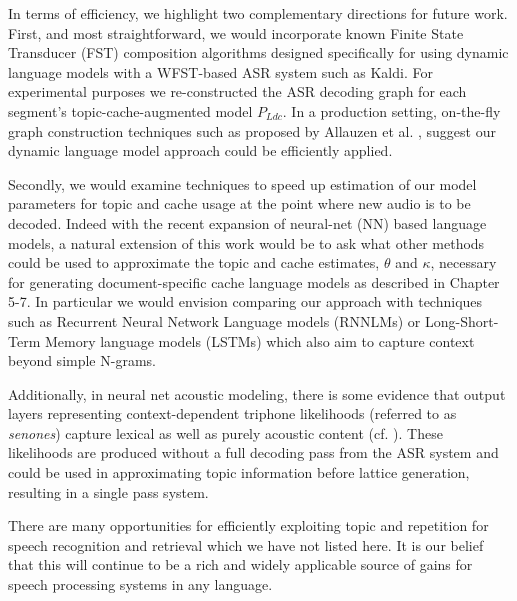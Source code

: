 In terms of efficiency, we highlight two complementary directions for future work.  First, and most straightforward, we would incorporate known Finite State Transducer (FST) composition algorithms designed specifically for using dynamic language models with a WFST-based ASR system such as Kaldi.  For experimental purposes we re-constructed the ASR decoding graph for each segment's topic-cache-augmented model $P_{Ldc}$.  In a production setting, on-the-fly graph construction techniques such as proposed by Allauzen et al. \cite{allauzen2009}, suggest our dynamic language model approach could be efficiently applied.

Secondly, we would examine techniques to speed up estimation of our model parameters for topic and cache usage at the point where new audio is to be decoded.  Indeed with the recent expansion of neural-net (NN) based language models, a natural extension of this work would be to ask what other methods could be used to approximate the topic and cache estimates, $\theta$ and $\kappa$, necessary for generating document-specific cache language models as described in Chapter 5-7.  In particular we would envision comparing our approach with techniques such as Recurrent Neural Network Language models (RNNLMs) or Long-Short-Term Memory language models (LSTMs) which also aim to capture context beyond simple N-grams.

Additionally, in neural net acoustic modeling, there is some evidence that output layers representing context-dependent triphone likelihoods (referred to as \textit{senones}) capture lexical as well as purely acoustic content (cf. \cite{wintrode2015recommender}).  These likelihoods are produced without a full decoding pass from the ASR system and could be used in approximating topic information before lattice generation, resulting in a single pass system.

There are many opportunities for efficiently exploiting topic and repetition for speech recognition and retrieval which we have not listed here.  It is our belief that this will continue to be a rich and widely applicable source of gains for speech processing systems in any language.
\\[1ex]


